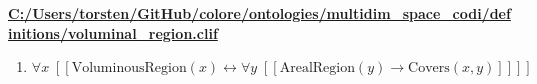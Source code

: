 \documentclass{article}
\begin{document}
\textbf{\url{C:/Users/torsten/GitHub/colore/ontologies/multidim\_space\_codi/definitions/voluminal\_region.clif}}

\begin{enumerate}
\item $\forall x\;  \left[ \left[ \textrm{VoluminousRegion}(x) \leftrightarrow \forall y\;  \left[ \left[ \textrm{ArealRegion}(y) \rightarrow \textrm{Covers}(x,y) \right] \right] \right] \right]$
\end{enumerate}
\end{document}
